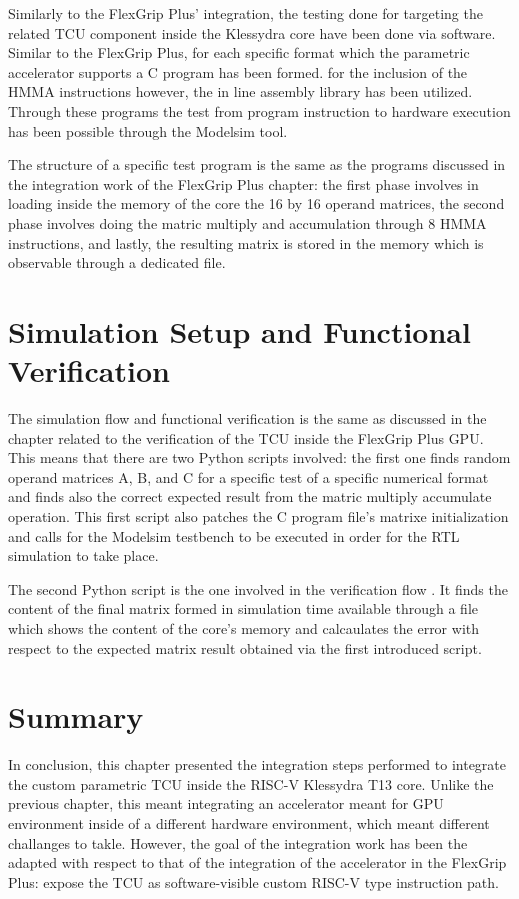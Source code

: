 Similarly to the FlexGrip Plus' integration, the testing done for targeting the related TCU component inside the Klessydra core have been done via software. Similar to the FlexGrip Plus, for each specific format which the parametric accelerator supports a C program has been formed. for the inclusion of the HMMA instructions however, the in line assembly library has been utilized. Through these programs the test from program instruction to hardware execution has been possible through the Modelsim tool.

The structure of a specific test program is the same as the programs discussed in the integration work of the FlexGrip Plus chapter: the first phase involves in loading inside the memory of the core the 16 by 16 operand matrices, the second phase involves doing the matric multiply and accumulation through 8 HMMA instructions, and lastly, the resulting matrix is stored in the memory which is observable through a dedicated file.

\section{Simulation Setup and Functional Verification}

The simulation flow and functional verification is the same as discussed in the chapter related to the verification of the TCU inside the FlexGrip Plus GPU. This means that there are two Python scripts involved: the first one finds random operand matrices A, B, and C for a specific test of a specific numerical format and finds also the correct expected result from the matric multiply accumulate operation. This first script also patches the C program file's matrixe initialization and calls for the Modelsim testbench to be executed in order for the RTL simulation to take place. 

The second Python script is the one involved in the verification flow . It finds the content of the final matrix formed in simulation time available through a file which shows the content of the core's memory and calcaulates the error with respect to the expected matrix result obtained via the first introduced script.

\section{Summary}

In conclusion, this chapter presented the integration steps performed to integrate the custom parametric TCU inside the RISC-V Klessydra T13 core. Unlike the previous chapter, this meant integrating an accelerator meant for GPU environment inside of a different hardware environment, which meant different challanges to takle. However, the goal of the integration work has been the adapted with respect to that  of the integration of the accelerator in the FlexGrip Plus: expose the TCU as software-visible custom RISC-V type instruction path.


